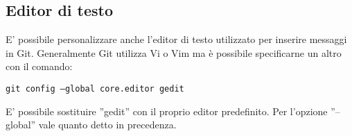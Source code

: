 \subsection{Editor di testo}
E' possibile personalizzare anche l'editor di testo utilizzato per inserire messaggi in Git. Generalmente Git utilizza Vi o Vim ma è possibile specificarne un altro con il comando:

\begin{center}
\texttt{git config --global core.editor gedit}
\end{center}

E' possibile sostituire ''gedit'' con il proprio editor predefinito. Per l'opzione ''--global'' vale quanto detto in precedenza.